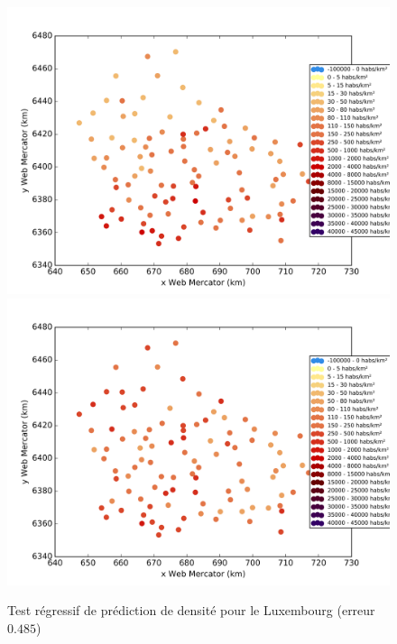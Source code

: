 \documentclass{book}
\begin{document}
\begin{figure}[H]
\begin{center}
\includegraphics[scale=0.5]{images/luxembourg_ground_truth.png}
\includegraphics[scale=0.5]{images/luxembourg_Random_Forest_Regression.png}
\end{center}
\caption{Test régressif de prédiction de densité pour le Luxembourg (erreur $0.485$)}
\label{test_luxembourg}
\end{figure}
\clearpage
\end{document}
